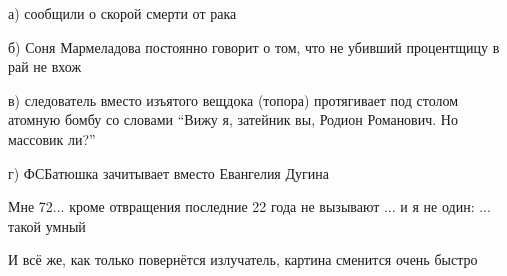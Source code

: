 \begin{itemize}
а) сообщили о скорой смерти от рака

б) Соня Мармеладова постоянно говорит о том, что не убивший процентщицу в рай
не вхож

в) следователь вместо изъятого вещдока (топора) протягивает под столом атомную
бомбу со словами \enquote{Вижу я, затейник вы, Родион Романович. Но массовик ли?}

г) ФСБатюшка зачитывает вместо Евангелия Дугина


Мне 72... кроме отвращения последние 22 года не вызывают ... и я не один: ...
такой умный


И всё же, как только повернётся излучатель, картина сменится очень быстро


\end{itemize} %
